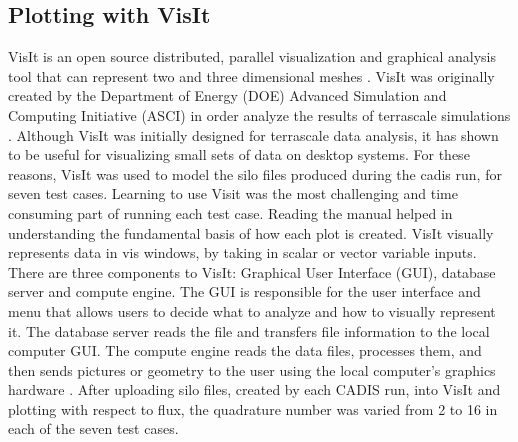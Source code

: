 \documentclass[10pt]{article}
\begin{document}
\subsection{Plotting with VisIt}

	VisIt is an open source distributed, parallel visualization and graphical analysis tool that can represent two and three dimensional meshes \cite{llnl:visit}. VisIt was originally created by the Department of Energy (DOE) Advanced Simulation and Computing Initiative (ASCI) in order analyze the results of terrascale simulations \cite{llnl:visit}. Although VisIt was initially designed for terrascale data analysis, it has shown to be useful for visualizing small sets of data on desktop systems. For these reasons, VisIt was used to model the silo files produced during the cadis run, for seven test cases. 
	Learning to use Visit was the most challenging and time consuming part of running each test case. Reading the manual helped in understanding the fundamental basis of how each plot is created. VisIt visually represents data in vis windows, by taking in scalar or vector variable inputs. There are three components to VisIt: Graphical User Interface (GUI), database server and compute engine. The GUI is responsible for the user interface and menu that allows users to decide what to analyze and how to visually represent it. The database server reads the file and transfers file information to the local computer GUI. The compute engine reads the data files, processes them, and then sends pictures or geometry to the user using the local computer’s graphics hardware \cite{software:visit}.
	After uploading silo files, created by each CADIS run, into VisIt and plotting with respect to flux, the quadrature number was varied from 2 to 16 in each of the seven test cases. 
\end{document}
